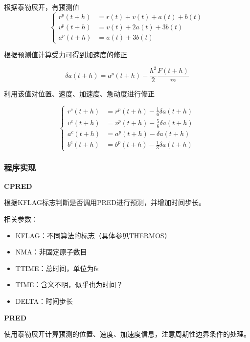\documentclass[UTF-8]{ctexart}
\begin{document}
根据泰勒展开，有预测值
\begin{equation}
    \left\{\begin{aligned}
        r^p(t + h) & = r(t) + v(t) + a(t) + b(t) \\
        v^p(t + h) & = v(t) + 2a(t) + 3b(t)      \\
        a^p(t + h) & = a(t) + 3b(t)
    \end{aligned}
    \right.
\end{equation}

根据预测值计算受力可得到加速度的修正

\begin{equation}
    \delta a(t + h) = a^p(t + h) - \frac{h^2}{2} \frac{F(t+h)}{m}
\end{equation}

利用该值对位置、速度、加速度、急动度进行修正

\begin{equation}
    \left\{\begin{aligned}
        r^c(t + h) & = r^p(t+h) - \frac{1}{6}\delta a(t+h) \\
        v^c(t + h) & = v^p(t+h) - \frac{5}{6}\delta a(t+h) \\
        a^c(t + h) & = a^p(t+h) - \delta a(t+h)            \\
        b^c(t + h) & = b^p(t+h) - \frac{1}{3}\delta a(t+h)
    \end{aligned}
    \right.
\end{equation}

\subsubsection{程序实现}

\noindent
\textbf{CPRED}

根据KFLAG标志判断是否调用PRED进行预测，并增加时间步长。

\noindent
相关参数：
\begin{itemize}
    \item KFLAG：不同算法的标志（具体参见THERMOS）
    \item NMA：非固定原子数目
    \item TTIME：总时间，单位为fs
    \item TIME：含义不明，似乎也为时间？
    \item DELTA：时间步长
\end{itemize}

\noindent
\textbf{PRED}

使用泰勒展开计算预测的位置、速度、加速度信息，注意周期性边界条件的处理。
\end{document}
